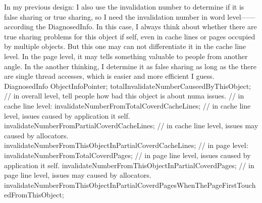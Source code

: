In my previous design:
    I also use the invalidation number to determine if it is false sharing or true sharing, so I need the invalidation number in word
level------according the DiagnosedInfo. In this case, I always think about whether there are true sharing problems for this object
if self, even in cache lines or pages occupied by multiple objects. But this one may can not differentiate it in the cache line level.
In the page level, it may tells something valuable to people from another angle.
In the another thinking, I determine it as false sharing as long as the there are single thread accesses, which is easier and more efficient I guess.
        DiagnosedInfo {
                ObjectInfoPointer;
                totalInvalidateNumberCauseedByThisObject;   // in overall level, tell people how bad this object is about numa issues.
                // in cache line level:
                invalidateNumberFromTotalCoverdCacheLines;   // in cache line level, issues caused by application it self.
                invalidateNumberFromPartialCoverdCacheLines;  // in cache line level, issues may caused by allocators.
                invalidateNumberFromThisObjectInPartialCoverdCacheLines;
                // in page level:
                invalidateNumberFromTotalCoverdPages;    // in page line level, issues caused by application it self.
                invalidateNumberFromThisObjectInPartialCoverdPages;   // in page line level, issues may caused by allocators.
                invalidateNumberFromThisObjectInPartialCoverdPagesWhenThePageFirstTouchedFromThisObject;
        }


